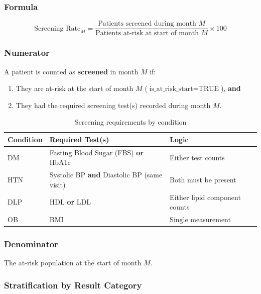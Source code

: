 \documentclass[11pt,a4paper]{article}
\begin{document}
\subsubsection{Formula}

\begin{equation}
\text{Screening Rate}_{M} =
\frac{\text{Patients screened during month } M}
     {\text{Patients at-risk at start of month } M} \times 100
\end{equation}

\subsubsection{Numerator}

A patient is counted as \textbf{screened} in month $M$ if:
\begin{enumerate}[leftmargin=*]
    \item They are at-risk at the start of month $M$ ($\text{is\_at\_risk\_start} = \text{TRUE}$), \textbf{and}
    \item They had the required screening test(s) recorded during month $M$.
\end{enumerate}

\begin{table}[ht]
\centering
\caption{Screening requirements by condition}
\begin{tabular}{@{}lll@{}}
\toprule
\textbf{Condition} & \textbf{Required Test(s)} & \textbf{Logic} \\
\midrule
DM & Fasting Blood Sugar (FBS) \textbf{or} HbA1c & Either test counts \\
HTN & Systolic BP \textbf{and} Diastolic BP (same visit) & Both must be present \\
DLP & HDL \textbf{or} LDL & Either lipid component counts \\
OB & BMI & Single measurement \\
\bottomrule
\end{tabular}
\end{table}

\subsubsection{Denominator}

The at-risk population at the start of month $M$.

\subsubsection{Stratification by Result Category}
\end{document}
